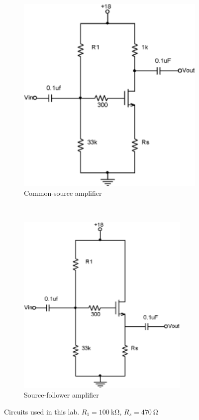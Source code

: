 \begin{figure}[hbtp]
  \centering
  \begin{subfigure}[b]{0.5\textwidth}
    \includegraphics[width=\textwidth]{common-source}
    \caption{\label{schem:common-source} Common-source amplifier}
  \end{subfigure}%
  ~
  \begin{subfigure}[b]{0.5\textwidth}
    \includegraphics[width=\textwidth]{source-follower}
    \caption{\label{schem:source-follower} Source-follower amplifier}
  \end{subfigure}
  \caption{\label{fig:schematics} Circuits used in this lab. $R_1=\SI{100}{\kilo\ohm}$,  $R_s=\SI{470}{\ohm}$}
\end{figure}


